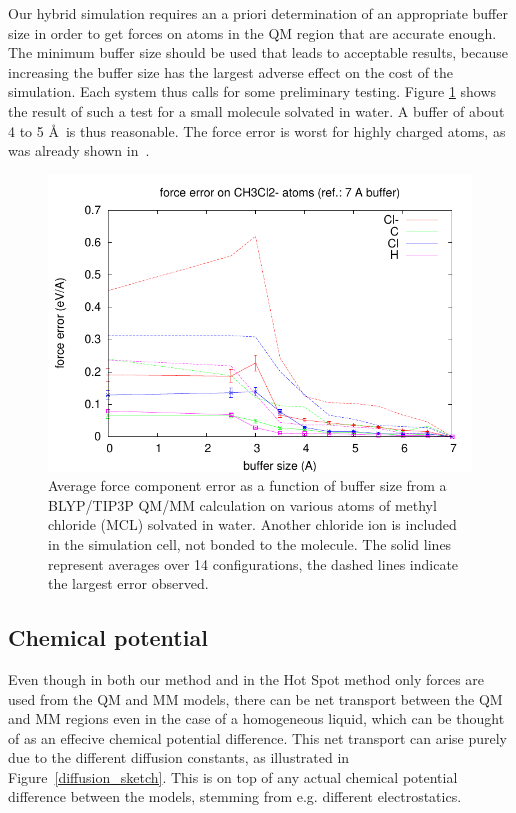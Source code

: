 \documentclass[11pt]{revtex4}
\begin{document}
Our hybrid simulation requires an a priori determination of an appropriate buffer size in order to get forces on atoms in the QM region that are accurate enough. The minimum buffer size should be used that leads to acceptable results, because increasing the buffer size has the largest adverse effect on the cost of the simulation. Each system thus calls for some preliminary testing. Figure \ref{MCLbuftest} shows the result of such a test for a small molecule solvated in water. A buffer of about 4 to 5 \AA\ is thus reasonable. The force error is worst for highly charged atoms, as was already shown in~\cite{solt_j_phys_chem_b_2009a}.

\begin{figure}
\includegraphics{force_error_MCL}
\caption{Average force component error as a function of buffer size from a BLYP/TIP3P QM/MM calculation on various atoms of methyl chloride (MCL) solvated in water. Another chloride ion is included in the simulation cell, not bonded to the molecule. The solid lines represent averages over 14 configurations, the dashed lines indicate the largest error observed. }
\label{MCLbuftest}
\end{figure}

\subsection{Chemical potential}

Even though in both our method and in the Hot Spot method only forces are used from the QM and MM models, there can be net transport between the QM and MM regions even in the case of a homogeneous liquid, which can be thought of as an effecive chemical potential difference. This net transport can arise purely due to the different diffusion constants, as illustrated in Figure~\ref{diffusion_sketch}. This is on top of any actual chemical potential difference between the models, stemming from e.g. different electrostatics. 
\end{document}
